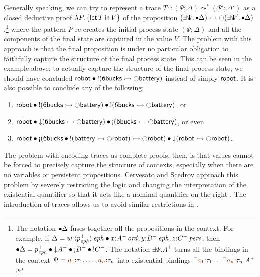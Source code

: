 Generally speaking, we can try to represent a trace $T :: (\Psi;
\Delta) \leadsto^* (\Psi'; \Delta')$ as a closed deductive proof
$\lambda P.\,\{{\sf let}\,{T}\,{\sf in}\, {V} \}$ of the proposition $(\exists
\Psi.\,{\mathbin{\bullet}}\Delta) \rightarrowtail {\ocircle}(\exists
\Psi'.\,{\mathbin{\bullet}}\Delta)$,\footnote{The notation ${\mathbin{\bullet}}{\Delta}$ fuses
  together all the propositions in the context. For example, if
  $\Delta = w{:}{\langle {p^+_{\it eph}} \rangle}\,{{\it eph}} \mathbin{\bullet} x{:}{A^-}\,{{\it ord}},
  y{:}{B^-}\,{{\it eph}}, z{:}{C^-}\,{{\it pers}}$, then ${\fuse}{\Delta} = p^+_\meph
  \fuse {\downarrow}A^- \fuse {\gnab}B^- \fuse {!}C^-$. The notation
  $\exists \Psi. A^+$ turns all the bindings in the context $\Psi =
  \lf{a_1}{:}\tau_1,\ldots,\lf{a_n}{:}\tau_n$ into existential
  bindings $\exists \lf{a_1}{:}\tau_1\ldots\exists
  \lf{a_n}{:}\tau_n.A^+$.}  where the pattern $P$ re-creates the initial
process state $(\Psi; \Delta)$ and all the components of the final
state are captured in the value $V$.  The problem with this approach
is that the final proposition is under no particular obligation to
faithfully
capture the structure of the final process state. This can be seen in
the example above: to actually capture the structure of the final
process state, we should have concluded ${\sf robot} \mathbin{\bullet} {!}({\sf
  6bucks} \rightarrowtail {\ocircle}{\sf battery})$ instead of simply ${\sf
  robot}$. It is also possible to conclude any of the following:
\smallskip
\begin{enumerate}
\item ${\sf robot} \mathbin{\bullet} {!}({\sf 6bucks} \rightarrowtail {\ocircle}{\sf
  battery}) \mathbin{\bullet} {!}({\sf 6bucks} \rightarrowtail {\ocircle}{\sf
  battery})$, or 
\item ${\sf robot} \fuse {\downarrow}({\sf 6bucks} \lefti {\ocircle}{\sf
  battery}) \fuse {\gnab}({\sf 6bucks} \lefti {\ocircle}{\sf
  battery})$, or even
\item ${\sf robot}  \fuse {\gnab}({\sf 6bucks} \fuse {!}({\sf battery} \lefti {\ocircle}{\sf robot}) \lefti {\ocircle}{\sf robot})
  \fuse {\downarrow}({\sf robot}
\lefti {\ocircle}{\sf robot})$.
\end{enumerate}
\smallskip 
%
The problem with encoding traces as complete proofs, then, is that
values cannot be forced to 
precisely capture the structure of contexts, especially when there are
no variables or persistent propositions. Cervesato and Scedrov
approach this problem by severely restricting the logic and changing
the interpretation of the existential quantifier so that it acts like
a nominal quantifier on the right \cite{cervesato09relating}. The
introduction of traces allows us to avoid similar restrictions in
\sls.

